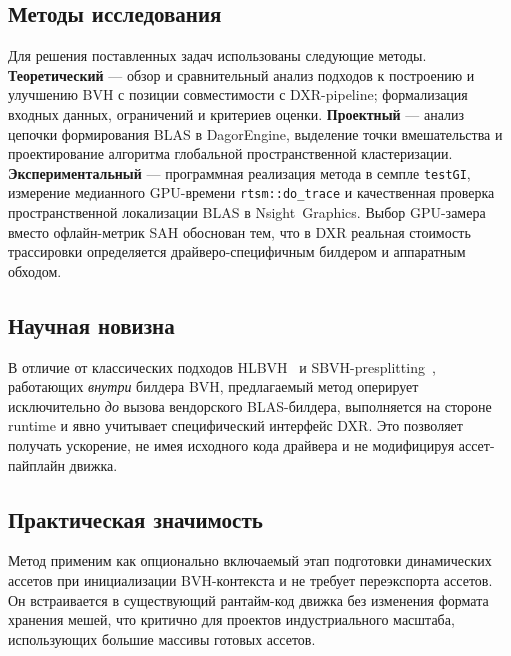 \subsection{Методы исследования}

Для решения поставленных задач использованы следующие методы.
\textbf{Теоретический} --- обзор и сравнительный анализ подходов к построению
и улучшению BVH с позиции совместимости с DXR-pipeline; формализация входных данных, ограничений и
критериев оценки.
\textbf{Проектный} --- анализ цепочки формирования BLAS в DagorEngine,
выделение точки вмешательства и проектирование алгоритма глобальной
пространственной кластеризации.
\textbf{Экспериментальный} --- программная реализация метода в семпле
\texttt{testGI}, измерение медианного GPU-времени \texttt{rtsm::do\_trace}
и качественная проверка пространственной локализации BLAS в Nsight~Graphics. Выбор GPU-замера вместо офлайн-метрик SAH
обоснован тем, что в DXR реальная стоимость трассировки определяется
драйверо-специфичным билдером и аппаратным обходом.

\subsection{Научная новизна}

В отличие от классических подходов
HLBVH~\cite{HLBVH} и SBVH-presplitting~\cite{ganestam16_splitting},
работающих \emph{внутри} билдера BVH, предлагаемый метод оперирует
исключительно \emph{до} вызова вендорского BLAS-билдера, выполняется
на стороне runtime и явно учитывает специфический интерфейс DXR. Это позволяет получать ускорение, не имея
исходного кода драйвера и не модифицируя ассет-пайплайн движка.

\subsection{Практическая значимость}

Метод применим как опционально включаемый этап подготовки
динамических ассетов при инициализации BVH-контекста и не
требует переэкспорта ассетов. Он встраивается в существующий
рантайм-код движка без изменения формата хранения мешей, что
критично для проектов индустриального масштаба, использующих
большие массивы готовых ассетов.
